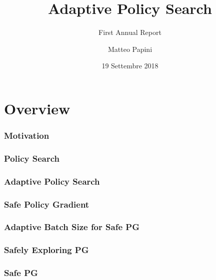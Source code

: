 \documentclass{beamer}
\title[Adaptive Policy Search]{Adaptive Policy Search}
\subtitle{First Annual Report}
\author[M. Papini]{Matteo Papini}
\date[19/9/2018]{19 Settembre 2018}
\begin{document}

\begin{frame}
\titlepage
\end{frame}

\addtocounter{framenumber}{-1}



\section{Overview}

\begin{frame}
\frametitle{Motivation}


\end{frame}


\begin{frame}
\frametitle{Policy Search}


\end{frame}


\begin{frame}
\frametitle{Adaptive Policy Search}


\end{frame}


\begin{frame}
\frametitle{Safe Policy Gradient}


\end{frame}


\begin{frame}
\frametitle{Adaptive Batch Size for Safe PG}


\end{frame}


\begin{frame}
\frametitle{Safely Exploring PG}

\end{frame}


\begin{frame}
\frametitle{Safe PG}


\end{frame}
\end{document}
